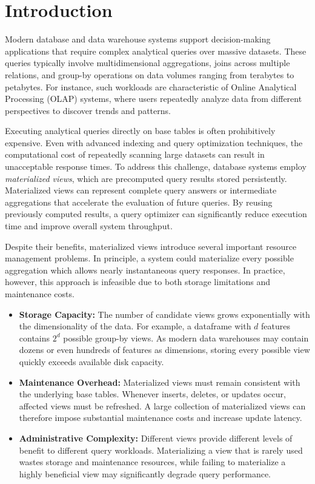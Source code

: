 \section{Introduction}

Modern database and data warehouse systems support decision-making applications that require complex analytical queries over massive datasets. These queries typically involve multidimensional aggregations, joins across multiple relations, and group-by operations on data volumes ranging from terabytes to petabytes. For instance, such workloads are characteristic of Online Analytical Processing (OLAP) systems, where users repeatedly analyze data from different perspectives to discover trends and patterns.

Executing analytical queries directly on base tables is often prohibitively expensive. Even with advanced indexing and query optimization techniques, the computational cost of repeatedly scanning large datasets can result in unacceptable response times. To address this challenge, database systems employ \emph{materialized views}, which are precomputed query results stored persistently. Materialized views can represent complete query answers or intermediate aggregations that accelerate the evaluation of future queries. By reusing previously computed results, a query optimizer can significantly reduce execution time and improve overall system throughput.

Despite their benefits, materialized views introduce several important resource management problems. In principle, a system could materialize every possible aggregation which allows nearly instantaneous query responses. In practice, however, this approach is infeasible due to both storage limitations and maintenance costs.

\begin{itemize}
    \item \textbf{Storage Capacity:} The number of candidate views grows exponentially with the dimensionality of the data. For example, a dataframe with $d$ features contains $2^d$ possible group-by views. As modern data warehouses may contain dozens or even hundreds of features as dimensions, storing every possible view quickly exceeds available disk capacity.

    \item \textbf{Maintenance Overhead:} Materialized views must remain consistent with the underlying base tables. Whenever inserts, deletes, or updates occur, affected views must be refreshed. A large collection of materialized views can therefore impose substantial maintenance costs and increase update latency.

    \item \textbf{Administrative Complexity:} Different views provide different levels of benefit to different query workloads. Materializing a view that is rarely used wastes storage and maintenance resources, while failing to materialize a highly beneficial view may significantly degrade query performance.
\end{itemize}

